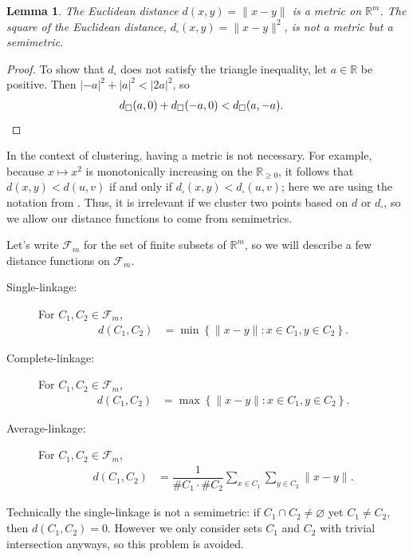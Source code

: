 \documentclass[a4paper, 12pt]{article}
\numberwithin{equation}{section}
\numberwithin{figure}{section}
\newtheorem{lem}[thm]{Lemma}
\theoremstyle{definition}
\renewcommand{\geq}{\geqslant}
\newcommand{\R}{\mathbb{R}}
\begin{document}
\begin{lem}\label{lem:semimetrics}
	The Euclidean distance $d(x,y) = \|x-y\|$ is a metric on $\R^m$. The square
	of the Euclidean distance, $d_{\square}(x,y)=\|x-y\|^2$, is not a metric but
	a semimetric.
\end{lem}

\begin{proof}
	To show that $d_{\square}$ does not satisfy the triangle inequality, let
	$a\in\R$ be positive. Then $|-a|^2 + |a|^2 < |2a|^2$, so
	\begin{align*}
		d_{\square}(a,0) + d_{\square}(-a,0) &< d_{\square}(a,-a). \qedhere
	\end{align*}
\end{proof}

In the context of clustering, having a metric is not necessary. For example,
because $x\mapsto x^2$ is monotonically increasing on the $\R_{\geq 0}$, it
follows that $d(x,y) < d(u,v)$ if and only if $d_{\square}(x,y) <
d_{\square}(u,v)$; here we are using the notation from .
Thus, it is irrelevant if we cluster two points based on $d$ or $d_{\square}$,
so we allow our distance functions to come from semimetrics. 

Let's write $\mathscr{F}_m$ for the set of finite subsets of $\R^m$, so we will
describe a few distance functions on $\mathscr{F}_m$.
\begin{description}
	\item[Single-linkage:] For $C_1,C_2\in\mathscr{F}_m$, 
	\begin{align*}
		d(C_1, C_2) &= \min\left\{ \| x - y\| : x\in C_1, y\in C_2 \right\}. 
	\end{align*}
	\item[Complete-linkage:] For $C_1,C_2\in\mathscr{F}_m$, 
	\begin{align*}
		d(C_1, C_2) &= \max\left\{ \| x - y\| : x\in C_1, y\in C_2 \right\}. 
	\end{align*}
	\item[Average-linkage:] For $C_1,C_2\in\mathscr{F}_m$, 
	\begin{align*}
		d(C_1, C_2) &= \dfrac{1}{\# C_1 \cdot \# C_2} \sum_{x \in C_1} \sum_{y\in C_2} \|x - y\|. 
	\end{align*}
\end{description}
Technically the single-linkage is not a semimetric: if $C_1\cap C_2\neq
\varnothing$ yet $C_1\neq C_2$, then $d(C_1, C_2)=0$. However we only consider
sets $C_1$ and $C_2$ with trivial intersection anyways, so this problem is
avoided. 
\end{document}
